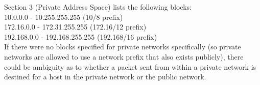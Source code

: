 Section 3 (Private Address Space) lists the following blocks: \\

10.0.0.0        -   10.255.255.255  (10/8 prefix) \\
172.16.0.0      -   172.31.255.255  (172.16/12 prefix) \\
192.168.0.0     -   192.168.255.255 (192.168/16 prefix) \\

If there were no blocks specified for private networks specifically (so private networks are allowed to use a network prefix that also exists publicly), there could be ambiguity as to whether a packet sent from within a private network is destined for a host in the private network or the public network.
